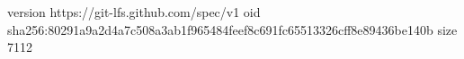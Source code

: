version https://git-lfs.github.com/spec/v1
oid sha256:80291a9a2d4a7c508a3ab1f965484feef8c691fc65513326cff8e89436be140b
size 7112
